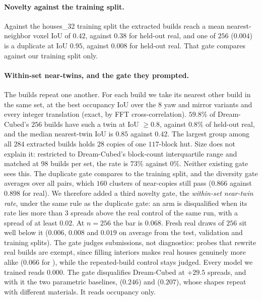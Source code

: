 \paragraph{Novelty against the training split.} Against the houses\_32 training split the
extracted builds reach a mean nearest-neighbor voxel IoU of $0.42$, against $0.38$ for
held-out real, and one of $256$ ($0.004$) is a duplicate at IoU $0.95$, against $0.008$ for
held-out real. That gate compares against our training split only.

\paragraph{Within-set near-twins, and the gate they prompted.} The builds repeat one
another. For each build we take its nearest other build in the same set, at the best
occupancy IoU over the $8$ yaw and mirror variants and every integer translation (exact,
by FFT cross-correlation). $59.8\%$ of Dream-Cubed's $256$ builds have such a twin at IoU
$\geq 0.8$, against $0.8\%$ of held-out real, and the median nearest-twin IoU is $0.85$
against $0.42$. The largest group among all $284$ extracted builds holds $28$ copies of
one $117$-block hut. Size does not explain it: restricted to Dream-Cubed's block-count
interquartile range and matched at $98$ builds per set, the rate is $73\%$ against $0\%$.
Neither existing gate sees this. The duplicate gate compares to the training split, and
the diversity gate averages over all pairs, which $160$ clusters of near-copies still
pass ($0.866$ against $0.898$ for real). We therefore added a third novelty gate, the
\emph{within-set near-twin rate}, under the same rule as the duplicate gate: an arm is
disqualified when its rate lies more than $3$ spreads above the real control of the same
run, with a spread of at least $0.02$. At $n{=}256$ the bar is $0.068$. Fresh real draws
of $256$ sit well below it ($0.006$, $0.008$ and $0.019$ on average from the test,
validation and training splits). The gate judges submissions, not diagnostics: probes
that rewrite real builds are exempt, since filling interiors makes real houses genuinely
more alike ($0.066$ for \solidify{}), while the repeated-build control stays judged.
Every model we trained reads $0.000$. The gate
disqualifies Dream-Cubed at $+29.5$ spreads, and with it the two parametric baselines,
\hollowbox{} ($0.246$) and \gabled{} ($0.207$), whose shapes repeat with different
materials. It reads occupancy only.

